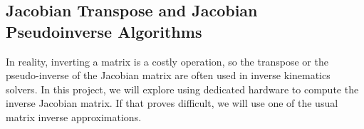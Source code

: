 \subsection{Jacobian Transpose and Jacobian Pseudoinverse Algorithms}
In reality, inverting a matrix is a costly operation, so the transpose or the pseudo-inverse of the Jacobian matrix are often used in inverse kinematics solvers.\cite{ik_intro} In this project, we will explore using dedicated hardware to compute the inverse Jacobian matrix. If that proves difficult, we will use one of the usual matrix inverse approximations.